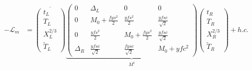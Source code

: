 \documentclass[10pt]{article}
\begin{document}
\begin{align*} -\mathcal{L}_{m} &= 
\overline{\begin{pmatrix}
t_{L} \\ T_{L} \\ X^{2/3}_{L} \\ \tilde{T}_{L}
\end{pmatrix}}
\underbrace{\begin{pmatrix}
0 & \Delta_{L} & 0 & 0 \\
0 & M_{0} + \frac{fys^{2}}{2} & \frac{yfs^{2}}{2} & \frac{yfsc}{\sqrt{2}} \\
0 & \frac{yfs^{2}}{2} & M_{0} + \frac{fys^{2}}{2} & \frac{yfsc}{\sqrt{2}} \\
\Delta_{R} & \frac{yfsc}{\sqrt{2}} & \frac{fysc}{\sqrt{2}} & M_{0} + yfc^{2}
\end{pmatrix}}_{M^t}
\begin{pmatrix}
t_{R} \\ T_{R} \\ X^{2/3}_{R} \\ \tilde{T}_{R}
\end{pmatrix} + h.c. \\
\end{align*}
\end{document}
